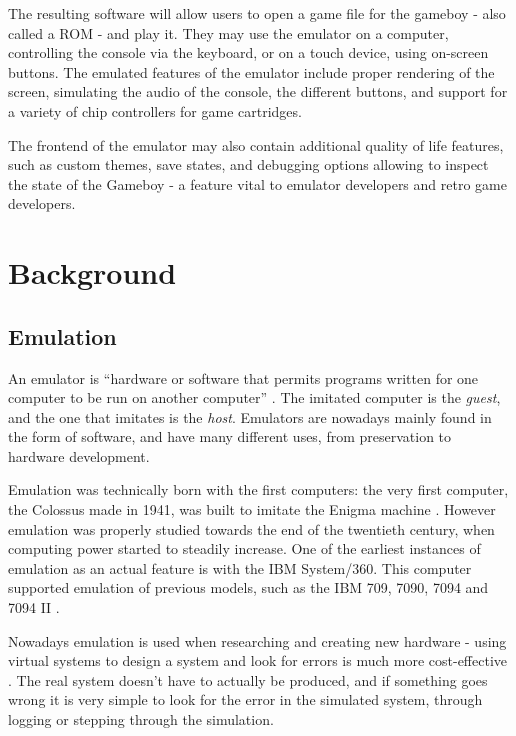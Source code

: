 \documentclass[11pt]{report}
\begin{document}
The resulting software will allow users to open a game file for the gameboy - also called a ROM - and play it. They may use the emulator on a computer, controlling the console via the keyboard, or on a touch device, using on-screen buttons. The emulated features of the emulator include proper rendering of the screen, simulating the audio of the console, the different buttons, and support for a variety of chip controllers for game cartridges.

The frontend of the emulator may also contain additional quality of life features, such as custom themes, save states, and debugging options allowing to inspect the state of the Gameboy - a feature vital to emulator developers and retro game developers. 

\chapter{Background}

\section{Emulation}

An emulator is ``hardware or software that permits programs written for one computer to be run on another computer'' \cite{emulator_def}. The imitated computer is the \textit{guest}, and the one that imitates is the \textit{host}. Emulators are nowadays mainly found in the form of software, and have many different uses, from preservation to hardware development.

Emulation was technically born with the first computers: the very first computer, the Colossus made in 1941, was built to imitate the Enigma machine \cite{emulator_origin}. However emulation was properly studied towards the end of the twentieth century, when computing power started to steadily increase. One of the earliest instances of emulation as an actual feature is with the IBM System/360. This computer supported emulation of previous models, such as the IBM 709, 7090, 7094 and 7094 II \cite{ibm_emulation}.

Nowadays emulation is used when researching and creating new hardware - using virtual systems to design a system and look for errors is much more cost-effective \cite{emu_in_design}. The real system doesn't have to actually be produced, and if something goes wrong it is very simple to look for the error in the simulated system, through logging or stepping through the simulation.
\end{document}
